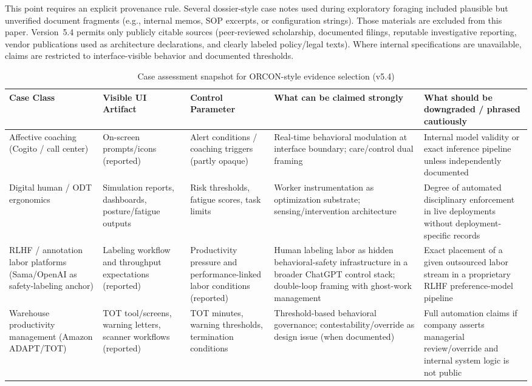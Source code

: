\documentclass[runningheads]{llncs}
\begin{document}
This point requires an explicit provenance rule. Several dossier-style case notes used during exploratory foraging included plausible but unverified document fragments (e.g., internal memos, SOP excerpts, or configuration strings). Those materials are excluded from this paper. Version~5.4 permits only publicly citable sources (peer-reviewed scholarship, documented filings, reputable investigative reporting, vendor publications used as architecture declarations, and clearly labeled policy/legal texts). Where internal specifications are unavailable, claims are restricted to interface-visible behavior and documented thresholds.

\begin{table}
\caption{Case assessment snapshot for ORCON-style evidence selection (v5.4)}\label{tab:case-assessment}
\centering
\small
\begin{tabular}{|p{2.4cm}|p{2.8cm}|p{2.3cm}|p{3.1cm}|p{3.1cm}|}
\hline
\textbf{Case Class} & \textbf{Visible UI Artifact} & \textbf{Control Parameter} & \textbf{What can be claimed strongly} & \textbf{What should be downgraded / phrased cautiously} \\
\hline
Affective coaching (Cogito / call center) & On-screen prompts/icons (reported) & Alert conditions / coaching triggers (partly opaque) & Real-time behavioral modulation at interface boundary; care/control dual framing \cite{delagarza2019time,cogito2023businesswire} & Internal model validity or exact inference pipeline unless independently documented \\
\hline
Digital human / ODT ergonomics & Simulation reports, dashboards, posture/fatigue outputs & Risk thresholds, fatigue scores, task limits & Worker instrumentation as optimization substrate; sensing/intervention architecture \cite{siemensPSXHuman,siemensHumanAdvanced} & Degree of automated disciplinary enforcement in live deployments without deployment-specific records \\
\hline
RLHF / annotation labor platforms (Sama/OpenAI as safety-labeling anchor) & Labeling workflow and throughput expectations (reported) & Productivity pressure and performance-linked labor conditions (reported) & Human labeling labor as hidden behavioral-safety infrastructure in a broader ChatGPT control stack; double-loop framing with ghost-work management \cite{perrigo2023time,gray2019ghost,kellogg2020algorithms} & Exact placement of a given outsourced labor stream in a proprietary RLHF preference-model pipeline \\
\hline
Warehouse productivity management (Amazon ADAPT/TOT) & TOT tool/screens, warning letters, scanner workflows (reported) & TOT minutes, warning thresholds, termination conditions & Threshold-based behavioral governance; contestability/override as design issue (when documented) \cite{gurley2022vice} & Full automation claims if company asserts managerial review/override and internal system logic is not public \\

\end{tabular}
\end{table}
\end{document}
